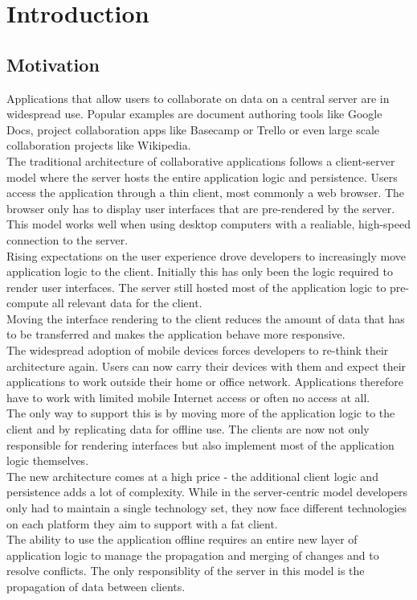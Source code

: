 
\chapter{Introduction}
\label{sec:intro}

\section{Motivation}
Applications that allow users to collaborate on data on a central server are in widespread use.
Popular examples are document authoring tools like Google Docs, project collaboration apps like Basecamp or Trello or even large scale collaboration projects like Wikipedia.\\

The traditional architecture of collaborative applications follows a client-server model where the server hosts the entire application logic and persistence.
Users access the application through a thin client, most commonly a web browser.
The browser only has to display user interfaces that are pre-rendered by the server.\\
This model works well when using desktop computers with a realiable, high-speed connection to the server.\\

Rising expectations on the user experience drove developers to increasingly move application logic to the client.
Initially this has only been the logic required to render user interfaces.
The server still hosted most of the application logic to pre-compute all relevant data for the client.\\
Moving the interface rendering to the client reduces the amount of data that has to be transferred and makes the application behave more responsive.\\

The widespread adoption of mobile devices forces developers to re-think their architecture again.
Users can now carry their devices with them and expect their applications to work outside their home or office network.
Applications therefore have to work with limited mobile Internet access or often no access at all.\\
The only way to support this is by moving more of the application logic to the client and by replicating data for offline use.
The clients are now not only responsible for rendering interfaces but also implement most of the application logic themselves.\\
The new architecture comes at a high price - the additional client logic and persistence adds a lot of complexity.
While in the server-centric model developers only had to maintain a single technology set, they now face different technologies on each platform they aim to support with a fat client.\\
The ability to use the application offline requires an entire new layer of application logic to manage the propagation and merging of changes and to resolve conflicts.
The only responsiblity of the server in this model is the propagation of data between clients.\\

